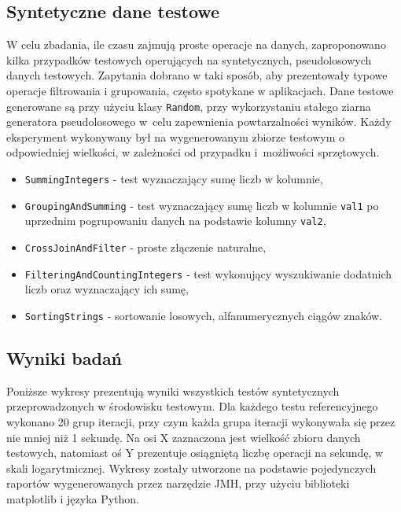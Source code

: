 \documentclass[12pt,twoside,openright]{extarticle}
\begin{document}
\subsection{Syntetyczne dane testowe}

    W celu zbadania, ile czasu zajmują proste operacje na danych, zaproponowano kilka przypadków testowych operujących na syntetycznych, pseudolosowych danych testowych. Zapytania dobrano w taki sposób, aby prezentowały typowe operacje filtrowania i grupowania, często spotykane w aplikacjach. Dane testowe generowane są przy użyciu klasy \texttt{Random}, przy wykorzystaniu stałego ziarna generatora pseudolosowego w~celu zapewnienia powtarzalności wyników. Każdy eksperyment wykonywany był na wygenerowanym zbiorze testowym o odpowiedniej wielkości, w zależności od przypadku i~możliwości sprzętowych.

\begin{itemize}
    \item \texttt{SummingIntegers} - test wyznaczający sumę liczb w kolumnie,
    \item \texttt{GroupingAndSumming} - test wyznaczający sumę liczb w kolumnie \texttt{val1} po uprzednim pogrupowaniu danych na podstawie kolumny \texttt{val2},
    \item \texttt{CrossJoinAndFilter} - proste złączenie naturalne,
    \item \texttt{FilteringAndCountingIntegers} - test wykonujący wyszukiwanie dodatnich liczb oraz wyznaczający ich sumę,
    \item \texttt{SortingStrings} - sortowanie losowych, alfanumerycznych ciągów znaków.
\end{itemize}

\newpage

\subsection{Wyniki badań}

    Poniższe wykresy prezentują wyniki wszystkich testów syntetycznych przeprowadzonych w środowisku testowym. Dla każdego testu referencyjnego wykonano 20 grup iteracji, przy czym każda grupa iteracji wykonywała się przez nie mniej niż 1 sekundę. Na osi X zaznaczona jest wielkość zbioru danych testowych, natomiast oś Y prezentuje osiągniętą liczbę operacji na sekundę, w skali logarytmicznej. Wykresy zostały utworzone na podstawie pojedynczych raportów wygenerowanych przez narzędzie JMH, przy użyciu biblioteki matplotlib \cite{matplotlib} i języka Python.
\end{document}
